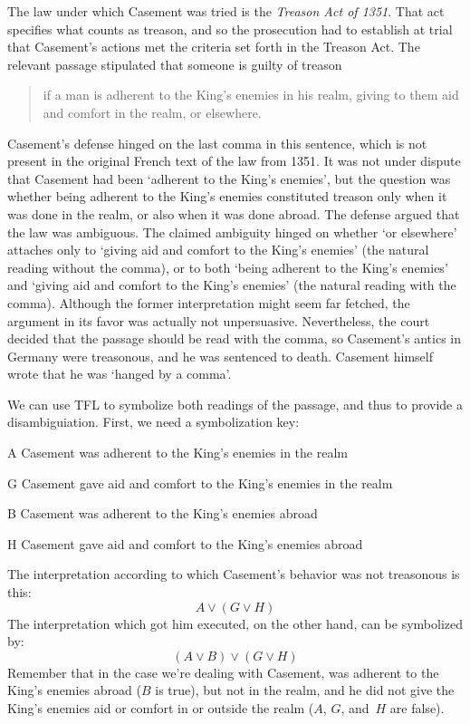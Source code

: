 The law under which Casement was tried is the \textit{Treason Act of 1351}. That act specifies what counts as treason, and so the prosecution had to establish at trial that Casement's actions met the criteria set forth in the Treason Act. The relevant passage stipulated that someone is guilty of treason
\begin{quote}
	if a man is adherent to the King's enemies in his
realm, giving to them aid and comfort in the realm, or elsewhere.
\end{quote}
Casement's defense hinged on the last comma in this sentence, which is not present in the original French text of the law from 1351.  It was not under dispute that Casement had been `adherent to the King's enemies', but the question was whether being adherent to the King's enemies constituted treason only when it was done in the realm, or also when it was done abroad. The defense argued that the law was ambiguous. The claimed ambiguity hinged on whether `or elsewhere' attaches only to `giving aid and comfort to the King's enemies' (the natural reading without the comma), or to both `being adherent to the King's enemies' and `giving aid and comfort to the King's enemies' (the natural reading with the comma).  Although the former interpretation might seem far fetched, the argument in its favor was actually not unpersuasive. Nevertheless, the court decided that the passage should be read with the comma, so Casement's antics in Germany were treasonous, and he was sentenced to death. Casement himself wrote that he was `hanged by a comma'.

We can use TFL to symbolize both readings of the passage, and thus to provide a disambiguiation. First, we need a symbolization key:
\begin{ekey}
	\item[A] Casement was adherent to the King's enemies in the realm
	\item[G] Casement gave aid and comfort to the King's enemies in the realm
	\item[B] Casement was adherent to the King's enemies abroad
	\item[H] Casement gave aid and comfort to the King's enemies abroad
\end{ekey}
The interpretation according to which Casement's behavior was not treasonous is this:
\[A \lor (G \lor H)\]
The interpretation which got him executed, on the other hand, can be symbolized by:
\[(A \lor B) \lor (G \lor H)\]
Remember that in the case we're dealing with Casement, was adherent to the King's enemies abroad ($B$ is true), but not in the realm, and he did not give the King's enemies aid or comfort in or outside the realm ($A$, $G$, and~$H$ are false).

